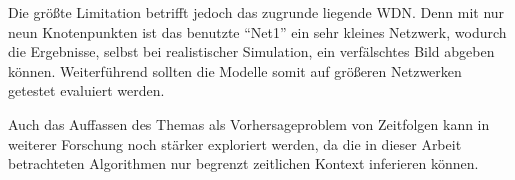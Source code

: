 Die größte Limitation betrifft jedoch das zugrunde liegende WDN. Denn mit nur neun Knotenpunkten ist das
 benutzte “Net1” ein sehr kleines Netzwerk, wodurch die Ergebnisse, selbst bei realistischer Simulation, ein
 verfälschtes Bild abgeben können. Weiterführend sollten die Modelle somit auf größeren Netzwerken getestet
 evaluiert werden.

Auch das Auffassen des Themas als Vorhersageproblem von Zeitfolgen kann in weiterer Forschung noch stärker
 exploriert werden, da die in dieser Arbeit betrachteten Algorithmen nur begrenzt zeitlichen Kontext inferieren
 können.

